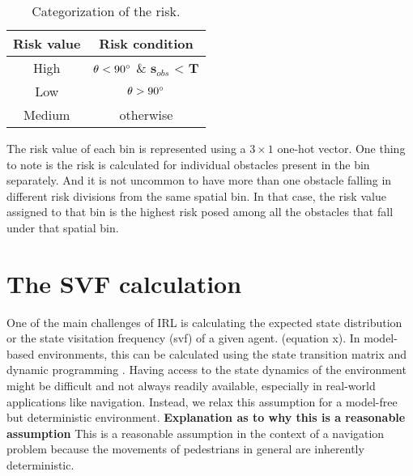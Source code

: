 \begin{table}[htbp]
	\caption{Categorization of the risk.}
	\label{risk-categorization-table}
	\begin{center}
		\renewcommand{\arraystretch}{1.3}
		\begin{tabular}{|c|c|}
			\hline
			Risk value & Risk condition \\
			\hline
			High & $\theta < 90\degree$ \&  $\mathbf{s}_{obs}$ < $\mathbf{T}$   \\
			
			Low & $\theta > 90\degree$\\
			
			Medium & otherwise \\
			\hline
		\end{tabular}
	\end{center}
\end{table}
The risk value of each bin is represented using a $3 \times 1$ one-hot vector. One thing to note is the risk is calculated for individual obstacles present in the bin separately. And it is not uncommon to have more than one obstacle falling in different risk divisions from the same spatial bin. In that case, the risk value assigned to that bin is the highest risk posed among all the obstacles that fall under that spatial bin.
\begin{figure}[!htbp]
\end{figure}

\section*{The SVF calculation}
One of the main challenges of IRL is calculating the expected state distribution or the state visitation frequency (svf) of a given agent. (equation x). In model-based environments, this can be calculated using the state transition matrix and dynamic programming \cite{wulfmeier-deepirl}. Having access to the state dynamics of the environment might be difficult and not always readily available, especially in real-world applications like navigation. Instead, we relax this assumption for a model-free but deterministic environment. \textbf{Explanation as to why this is a reasonable assumption} This is a reasonable assumption in the context of a navigation problem because the movements of pedestrians in general are inherently deterministic. %

